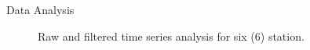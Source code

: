 \documentclass[final,a0,portrait]{beamer}
\newlength{\twocolwid}
\begin{document}
\begin{frame}[t]
\begin{columns}[t]
\begin{column}{\twocolwid}
\begin{block}{Data Analysis}
\begin{figure}
\begin{center}
  \textcolor{blue!40}{\vrule width 1pt}
\end{center}
    \caption{Raw and filtered time series analysis for six (6) station.}
    \label{fig:proc-net}
\end{figure}      

\end{block}




\end{column}
\end{columns}
\end{frame}
\end{document}
